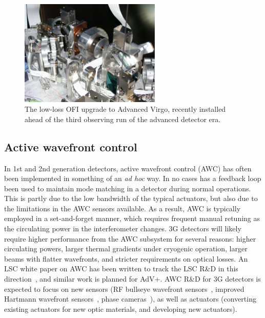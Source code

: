\begin{figure}[htb]
\centering
\includegraphics[width=0.6\textwidth]{Figures/LLFI.png}
\caption{The low-loss OFI upgrade to Advanced Virgo, recently installed ahead of the third observing run of the advanced detector era.\label{fig:AdVLLFI}}
\end{figure}


\subsection{Active wavefront control}
In 1st and 2nd generation detectors, active wavefront control (AWC) has often been implemented in something of an \emph{ad hoc} way. In no cases has a feedback loop been used to maintain mode matching in a detector during normal operations. This is partly due to the low bandwidth of the typical actuators, but also due to the limitations in the AWC sensors available. As a result, AWC is typically employed in a set-and-forget manner, which requires frequent manual retuning as the circulating power in the interferometer changes. 3G detectors will likely require higher performance from the AWC subsystem for several reasons: higher circulating powers, larger thermal gradients under cryogenic operation, larger beams with flatter wavefronts, and stricter requirements on optical losses. An LSC white paper on AWC has been written to track the LSC R\&D in this direction~\cite{aLIGO_AWC}, and similar work is planned for AdV+. AWC R\&D for 3G detectors is expected to focus on new sensors (RF bullseye wavefront sensors~\cite{bullseye}, improved Hartmann wavefront sensors~\cite{HWS}, phase cameras~\cite{phasecam}), as well as actuators (converting existing actuators for new optic materials, and developing new actuators). 
 
